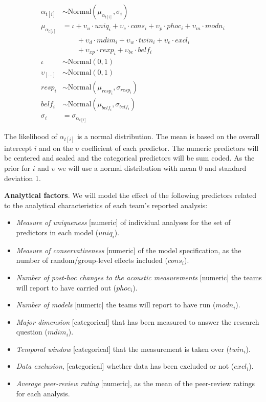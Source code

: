 \documentclass[
  12pt,
]{article}
\providecommand{\tightlist}{%
  \setlength{\itemsep}{0pt}\setlength{\parskip}{0pt}}
\begin{document}
\[
\begin{aligned}
\alpha_{\text{t}[i]}      & \sim \text{Normal}(\mu_{\alpha_{t[i]}}, \sigma_i) \\
\mu_{\alpha_{t[i]}}       & = \iota + \upsilon_u\cdot uniq_i + \upsilon_c\cdot cons_i + \upsilon_p\cdot phoc_i + \upsilon_m\cdot modn_i \\
 & \qquad + \upsilon_d\cdot mdim_i + \upsilon_w\cdot twin_i + \upsilon_e\cdot excl_i \\
 & \qquad + \upsilon_{xp}\cdot rexp_i + \upsilon_{be}\cdot belf_i  \\
\iota      & \sim \text{Normal}(0, 1) \\
\upsilon_{[\ldots]} & \sim \text{Normal}(0,1) \\
resp_i & \sim \text{Normal}(\mu_{resp_i}, \sigma_{resp_i}) \\
belf_i & \sim \text{Normal}(\mu_{belf_i}, \sigma_{belf_i}) \\
\sigma_i    & = \sigma_{\alpha_{t[i]}}
\end{aligned}
\]

The likelihood of \(\alpha_{t[i]}\) is a normal distribution.
The mean is based on the overall intercept \(i\) and on the \(\upsilon\) coefficient of each predictor.
The numeric predictors will be centered and scaled and the categorical predictors will be sum coded.
As the prior for \(i\) and \(\upsilon\) we will use a normal distribution with mean 0 and standard deviation 1.

\textbf{Analytical factors}. We will model the effect of the following predictors related to the analytical characteristics of each team's reported analysis:

\begin{itemize}
\tightlist
\item
  \emph{Measure of uniqueness} {[}numeric{]} of individual analyses for the set of predictors in each model (\(uniq_i\)).
\item
  \emph{Measure of conservativeness} {[}numeric{]} of the model specification, as the number of random/group-level effects included (\(cons_i\)).
\item
  \emph{Number of post-hoc changes to the acoustic measurements} {[}numeric{]} the teams will report to have carried out (\(phoc_i\)).
\item
  \emph{Number of models} {[}numeric{]} the teams will report to have run (\(modn_i\)).
\item
  \emph{Major dimension} {[}categorical{]} that has been measured to answer the research question (\(mdim_i\)).
\item
  \emph{Temporal window} {[}categorical{]} that the measurement is taken over (\(twin_i\)).
\item
  \emph{Data exclusion}, {[}categorical{]} whether data has been excluded or not (\(excl_i\)).
\item
  \emph{Average peer-review rating} {[}numeric{]}, as the mean of the peer-review ratings for each analysis.
\end{itemize}
\end{document}
